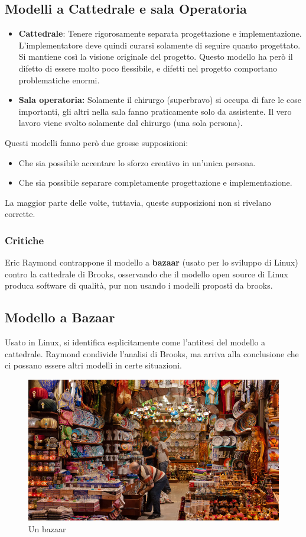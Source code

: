 \documentclass[a4paper,12pt]{article}
\begin{document}
\subsection{Modelli a Cattedrale e sala Operatoria}
\begin{itemize}
\item \textbf{Cattedrale}: Tenere rigorosamente separata progettazione e implementazione. L'implementatore deve quindi curarsi solamente di seguire quanto progettato. Si mantiene così la visione originale del progetto. Questo modello ha però il difetto di essere molto poco flessibile, e difetti nel progetto comportano problematiche enormi.
\item \textbf{Sala operatoria:} Solamente il chirurgo (superbravo) si occupa di fare le cose importanti, gli altri nella sala fanno praticamente solo da assistente. Il vero lavoro viene svolto solamente dal chirurgo (una sola persona).
\end{itemize}
Questi modelli fanno però due grosse supposizioni:
\begin{itemize}
\item Che sia possibile accentare lo sforzo creativo in un'unica persona.
\item Che sia possibile separare completamente progettazione e implementazione.
\end{itemize}
La maggior parte delle volte, tuttavia, queste supposizioni non si rivelano corrette.

\subsubsection{Critiche}
Eric Raymond contrappone il modello a \textbf{bazaar} (usato per lo sviluppo di Linux) contro la cattedrale di Brooks, osservando che il modello open source di Linux produca software di qualità, pur non usando i modelli proposti da brooks.

\subsection{Modello a Bazaar}
Usato in Linux, si identifica esplicitamente come l'antitesi del modello a cattedrale. Raymond condivide l'analisi di Brooks, ma arriva alla conclusione che ci possano essere altri modelli in certe situazioni.

\begin{figure}[H]
	\centering
	 \includegraphics[width=0.6\linewidth]{Immagini/bazaar.jpg}
	 \caption{Un bazaar}
\end{figure}
\end{document}
